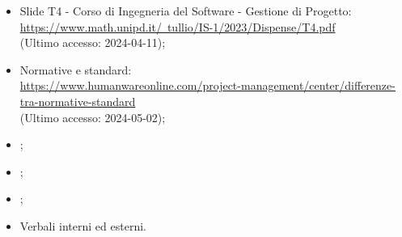 \begin{itemize}
  \item Slide T4 - Corso di Ingegneria del Software - Gestione di Progetto: \\ \href{https://www.math.unipd.it/~tullio/IS-1/2023/Dispense/T4.pdf}{https://www.math.unipd.it/~tullio/IS-1/2023/Dispense/T4.pdf}  \\ (Ultimo accesso: 2024-04-11);
  \item Normative e standard: \\ \href{https://www.humanwareonline.com/project-management/center/differenze-tra-normative-standard}{https://www.humanwareonline.com/project-management/center/differenze-tra-normative-standard}  \\ (Ultimo accesso: 2024-05-02);
  \item \PdP;
  \item \PdQ;
  \item \AdR;
  \item Verbali interni ed esterni.
\end{itemize}
